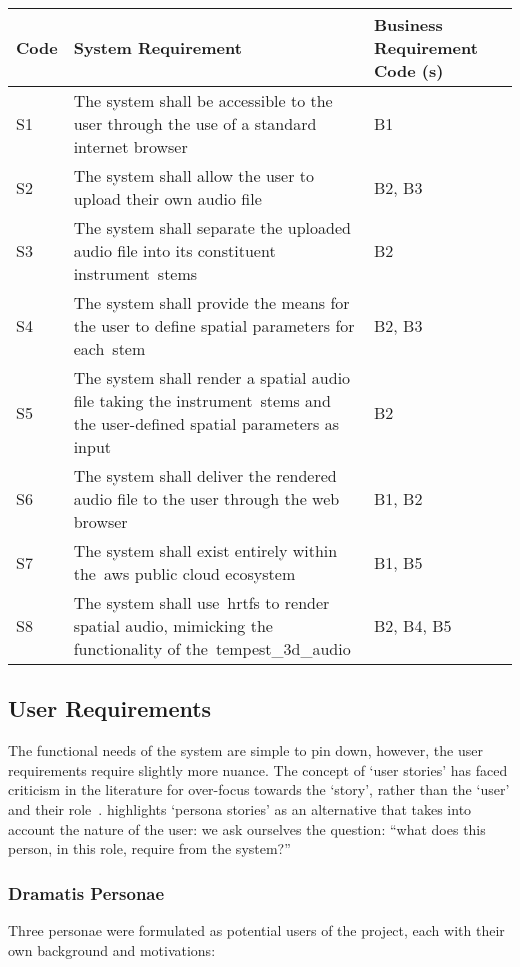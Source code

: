 \begin{tabularx}{\textwidth}{szs}
    \caption{System Requirements}\label{tab:system-requirements}\\
    \toprule
    \textbf{Code} & \textbf{System Requirement} & \textbf{Business Requirement Code (s)} \\\midrule
    S1 & The system shall be accessible to the user through the use of a standard internet browser & B1 \\\midrule
    S2 & The system shall allow the user to upload their own audio file & B2, B3 \\\midrule
    S3 & The system shall separate the uploaded audio file into its constituent instrument~\glspl{stem} & B2 \\\midrule
    S4 & The system shall provide the means for the user to define spatial parameters for each~\gls{stem} & B2, B3 \\\midrule
    S5 & The system shall render a spatial audio file taking the instrument~\glspl{stem} and the user-defined spatial parameters as input & B2 \\\midrule
    S6 & The system shall deliver the rendered audio file to the user through the web browser & B1, B2 \\\midrule
    S7 & The system shall exist entirely within the~\gls{aws} public cloud ecosystem & B1, B5 \\\midrule
    S8 & The system shall use~\glspl{hrtf} to render spatial audio, mimicking the functionality of the~\gls{tempest_3d_audio} & B2, B4, B5 \\\bottomrule
\end{tabularx}

\subsection{User Requirements}\label{subsec:user-requirements}
The functional needs of the system are simple to pin down, however, the user requirements require slightly more nuance.
The concept of `user stories' has faced criticism in the literature for over-focus towards the `story', rather than the `user' and their role~\citep{hudson2013user}.
\citet{hudson2013user} highlights `persona stories' as an alternative that takes into account the nature of the user: we ask ourselves the question: ``what does this person, in this role, require from the system?''

\subsubsection{Dramatis Personae}
Three personae were formulated as potential users of the project, each with their own background and motivations:

